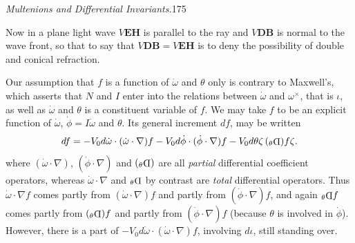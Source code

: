 \documentclass[11pt]{article}
\newcommand{\invd}{\mathord{\vcenter{\hbox{\rotatebox[origin=c]{180}{\(\mathrm{D}\)}}}}}
\newcommand{\thetaPi}{{}_\theta\invd}
\begin{document}
\newpage\thispagestyle{empty}\begin{center}\textit{Multenions and Differential Invariants.}\hfill 175\end{center}

\indent Now in a plane light wave $V\mathbf E\mathbf H$ is parallel to the ray and $V\mathbf D\mathbf B$ is normal to the wave front, so that to say that $V\mathbf D\mathbf B=V\mathbf E\mathbf H$ is to deny the possibility of double and conical refraction.

\indent Our assumption that $f$ is a function of $\dot\omega$ and $\theta$ only is contrary to Maxwell's, which asserts that $N$ and $I$ enter into the relations between $\dot\omega$ and $\omega^\times$, that is $\iota$, as well as $\dot\omega$ and $\theta$ is a constituent variable of $f$. We may take $f$ to be an explicit function of $\dot\omega$, $\dot\phi=I\dot\omega$ and $\theta$. Its general increment $df$, may be written
\[
  df=-V_0d\dot\omega\mathbin{\cdot}(\dot\omega\mathbin{\cdot}\nabla)f
     -V_0d\dot\phi\mathbin{\cdot}(\dot\phi\mathbin{\cdot}\nabla)f
     -V_0d\theta\zeta\,(\thetaPi)f\zeta.
\]
where $(\dot\omega\mathbin{\cdot}\nabla)$, $(\dot\phi\mathbin{\cdot}\nabla)$ and $(\thetaPi)$ are all \emph{partial} differential coefficient operators, whereas $\dot\omega\mathbin{\cdot}\nabla$ and $\thetaPi$ by contrast are \emph{total} differential operators. Thus $\dot\omega\mathbin{\cdot}\nabla f$ comes partly from $(\dot\omega\mathbin{\cdot}\nabla)f$ and partly from $(\dot\phi\mathbin{\cdot}\nabla)f$, and again $\thetaPi f$ comes partly from $(\thetaPi)f$ and partly from $(\dot\phi\mathbin{\cdot}\nabla)f$ (because $\theta$ is involved in $\dot\phi$). However, there is a part of $-V_0d\dot\omega\mathbin{\cdot}(\dot\omega\mathbin{\cdot}\nabla)f$, involving $d\iota$, still standing over.
\end{document}
